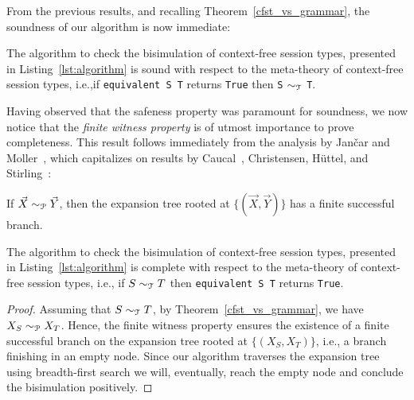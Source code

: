From the previous results, and recalling Theorem~\ref{cfst_vs_grammar},
the soundness of our algorithm is now immediate:

\begin{theorem}
	The algorithm to check the bisimulation of context-free session types,
	presented in Listing~\ref{lst:algorithm} is sound with respect to the
	meta-theory of context-free session types, i.e.,\linebreak if
	\lstinline|equivalent S T| returns
	\lstinline|True| then \lstinline|S| $\sim_{\mathcal T}$ \lstinline|T|.
\end{theorem}

Having observed that the safeness property was paramount for soundness,
we now notice that the \emph{finite witness property} is of utmost
importance to prove completeness. This result follows immediately from the
 analysis by Jan{\v{c}}ar and Moller~\cite{janvcar1999techniques}, which
 capitalizes on results by
Caucal~\cite{caucal1986decidabilite}, Christensen, H{\"{u}}ttel, and
Stirling~\cite{DBLP:journals/iandc/ChristensenHS95}:

\begin{proposition} 
\label{finite_witness}
	If $\vec X \sim_{\mathcal P} \vec Y$, then the expansion tree rooted at
	$\{(\vec X, \vec Y)\}$ has a finite successful branch.
\end{proposition}



\begin{theorem}
	The algorithm to check the bisimulation of context-free session types,
	presented in Listing~\ref{lst:algorithm} is complete with respect to the
	meta-theory of context-free session types, i.e., \linebreak if
	$S \sim_{\mathcal T} T$ then
	\lstinline|equivalent S T| returns \lstinline|True|.
\end{theorem}

\begin{proof}
	Assuming that $S \sim_{\mathcal T} T$, by
	Theorem~\ref{cfst_vs_grammar}, we
	have $X_{S} \sim_{\mathcal P} X_{T}$.
	Hence, the finite witness property
	ensures the existence of a finite successful branch on the expansion
	tree rooted at $\{(X_{S},X_{T})\}$,
	i.e., a branch finishing in an empty node.
	Since our algorithm traverses
	the expansion tree using breadth-first search we will, eventually,
	reach the empty node and conclude the bisimulation positively.
\end{proof}

